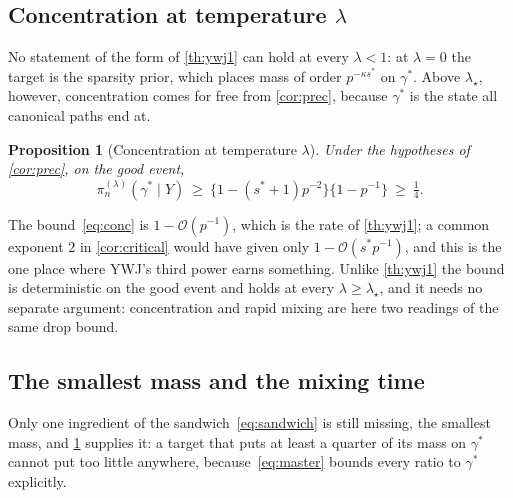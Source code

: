 \documentclass[aos]{imsart}
\theoremstyle{plain}
\newtheorem{proposition}{Proposition}[section]
\theoremstyle{definition}
\begin{document}
    \subsection{Concentration at temperature $\lambda$}
    \label{sub:concentration}

    No statement of the form of \cref{th:ywj1} can hold at every
    $\lambda<1$: at $\lambda=0$ the target is the sparsity prior, which
    places mass of order $p^{-\kappa s^{\ast}}$ on $\gamma^{\ast}$. Above
    $\lambda_\star$, however, concentration comes for free from
    \cref{cor:prec}, because $\gamma^{\ast}$ is the state all canonical
    paths end at.

    \begin{proposition}[Concentration at temperature $\lambda$]
        \label{prop:conc}
        Under the hypotheses of \cref{cor:prec}, on the good event,
        \begin{equation}
            \label{eq:conc}
            \pi_n^{(\lambda)}(\gamma^{\ast}\mid Y)
            \ \geq\ \bigl\{1-(s^{\ast}+1)p^{-2}\bigr\}
            \bigl\{1-p^{-1}\bigr\}\ \geq\ \tfrac14 .
        \end{equation}
    \end{proposition}


    The bound~\eqref{eq:conc} is $1-\mathcal{O}(p^{-1})$, which is the rate
    of \cref{th:ywj1}; a common exponent $2$ in \cref{cor:critical} would
    have given only $1-\mathcal{O}(s^{\ast}p^{-1})$, and this is the one
    place where YWJ's third power earns something. Unlike \cref{th:ywj1} the
    bound is deterministic on the good event and holds at every
    $\lambda\geq\lambda_\star$, and it needs no separate argument:
    concentration and rapid mixing are here two readings of the same drop
    bound.

    \subsection{The smallest mass and the mixing time}
    \label{sub:tau}

    Only one ingredient of the sandwich~\eqref{eq:sandwich} is still
    missing, the smallest mass, and \cref{prop:conc} supplies it: a target
    that puts at least a quarter of its mass on $\gamma^{\ast}$ cannot put
    too little anywhere, because~\eqref{eq:master} bounds every ratio to
    $\gamma^{\ast}$ explicitly.
\end{document}
